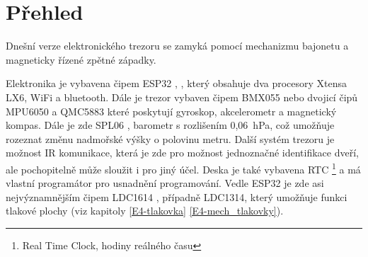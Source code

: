 \section{Přehled}

Dnešní verze elektronického trezoru se zamyká pomocí mechanizmu bajonetu a magneticky řízené zpětné západky. 

Elektronika je vybavena čipem ESP32 \parencite{ESP32}, \parencite{ESP32-WROVER-B},
který obsahuje dva procesory Xtensa LX6, WiFi a bluetooth. Dále je trezor vybaven čipem BMX055 \parencite{bmx055} nebo dvojicí čipů MPU6050 \parencite{mpu6050} 
a QMC5883 \parencite{qmc5883} které poskytují 
gyroskop, akcelerometr a magnetický kompas. Dále je zde SPL06 \parencite{spl06}, barometr s rozlišením 0,06~hPa, což umožňuje rozeznat změnu nadmořské výšky 
o polovinu metru. Další systém trezoru je možnost IR komunikace, která je zde pro možnost jednoznačné identifikace dveří, ale pochopitelně může 
sloužit i pro jiný účel. Deska je také vybavena RTC \footnote{Real Time Clock, hodiny reálného času} a má vlastní programátor pro usnadnění programování. Vedle ESP32 je zde asi 
nejvýznamnějším čipem LDC1614 \parencite{LDC1614}, případně LDC1314, který umožňuje funkci tlakové plochy (viz kapitoly \ref{E4-tlakovka} \ref{E4-mech_tlakovky}).


\begin{table}[h]
    \centering
    \caption{Shrnutí elektronického vybavení}
    \label{tab:COMPARATION}
\end{table}

\newpage